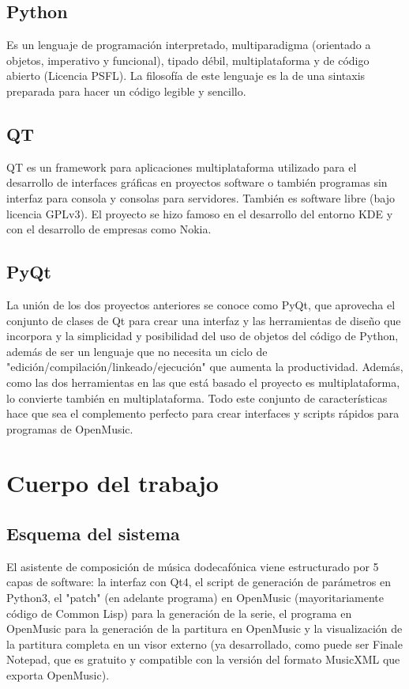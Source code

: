 \documentclass[a4paper,openany,12pt]{memoir}
\begin{document}
\section{Python}
Es un lenguaje de programación interpretado, multiparadigma (orientado a objetos, imperativo y funcional), tipado débil, multiplataforma y de código abierto (Licencia PSFL). La filosofía de este lenguaje es la de una sintaxis preparada para hacer un código legible y sencillo.

\section{QT}
QT es un framework para aplicaciones multiplataforma utilizado para el desarrollo de interfaces gráficas en proyectos software o también programas sin interfaz para consola y consolas para servidores. También es software libre (bajo licencia GPLv3). El proyecto se hizo famoso en el desarrollo del entorno KDE y con el desarrollo de empresas como Nokia.

\section{PyQt}
La unión de los dos proyectos anteriores se conoce como PyQt, que aprovecha el conjunto de clases de Qt para crear una interfaz y las herramientas de diseño que incorpora y la simplicidad y posibilidad del uso de objetos del código de Python, además de ser un lenguaje que no necesita un ciclo de "edición/compilación/linkeado/ejecución" que aumenta la productividad. Además, como las dos herramientas en las que está basado el proyecto es multiplataforma, lo convierte también en multiplataforma. Todo este conjunto de características hace que sea el complemento perfecto para crear interfaces y scripts rápidos para programas de OpenMusic.

\chapter{Cuerpo del trabajo}\label{cuerpo}
\section{Esquema del sistema}
El asistente de composición de música dodecafónica viene estructurado por 5 capas de software: la interfaz con Qt4, el script de generación de parámetros en Python3, el "patch" (en adelante programa) en OpenMusic (mayoritariamente código de Common Lisp) para la generación de la serie, el programa en OpenMusic para la generación de la partitura en OpenMusic y la visualización de la partitura completa en un visor externo (ya desarrollado, como puede ser Finale Notepad, que es gratuito y compatible con la versión del formato MusicXML que exporta OpenMusic).
\end{document}
